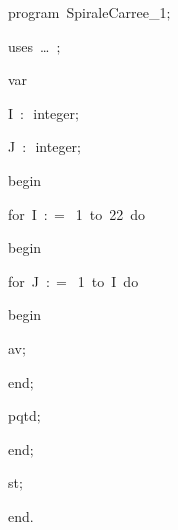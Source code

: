 
{
\parindent {}
\medskip

\carrenoir
\vspace{\neglskip}\mbox{\blc  \idt  \mcl program\idt \ SpiraleCarree\_1$;$
}\par 
\vspace{\neglskip}\mbox{\blc \blk\idt \mcl uses\idt \ \ldots\ $;$
}\par 
\pagebreak[3] 
\vspace{\neglskip}\mbox{\blc  \blk\idt  \mcl var\idt \ }\par 
\vspace{\neglskip}\mbox{\blc  \blk\blk\idt  I\ $:$\ integer$;$}\par 
\vspace{\neglskip}\mbox{\blc  \blk\blk\idt  J\ $:$\ integer$;$}\par 
\vspace{\neglskip}\mbox{\blc  \idt  \mcl begin\idt }\par 
\pagebreak[3] 
\vspace{\neglskip}\mbox{\blc  \blk\idt  \mcl for\idt \ I\ $:$$=$\ 1\ \mcl to\idt \ 22\ \mcl do\idt }\par 
\vspace{\neglskip}\mbox{\blc  \blk\blk\idt  \mcl begin\idt }\par 
\pagebreak[3] 
\vspace{\neglskip}\mbox{\blc  \blk\blk\blk\idt  \mcl for\idt \ J\ $:$$=$\ 1\ \mcl to\idt \ I\ \mcl do\idt }\par 
\vspace{\neglskip}\mbox{\blc  \blk\blk\blk\blk\idt  \mcl begin\idt }\par 
\vspace{\neglskip}\mbox{\blc  \blk\blk\blk\blk\blk\idt  av$;$}\par 
\vspace{\neglskip}\mbox{\blc  \blk\blk\blk\blk\idt  \mcl end\idt $;$}\par 
\vspace{\neglskip}\mbox{\blc  \blk\blk\blk\idt  pqtd$;$}\par 
\vspace{\neglskip}\mbox{\blc  \blk\blk\idt  \mcl end\idt $;$}\par 
\vspace{\neglskip}\mbox{\blc  \blk\idt  st$;$\ }\par 
\vspace{\neglskip}\mbox{\blc  \idt  \mcl end\idt $.$}\par 

\medskip }

